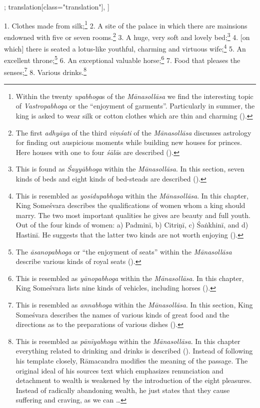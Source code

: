 \begin{alignment}[
  texts=edition[class="edition"];
  translation[class="translation"],
  ]
\begin{translation}
\begin{tlate}
  1. Clothes made from silk;\footnote{Within the twenty \textit{upabhoga}s of the \textit{Mānasollāsa} we find the interesting topic of \textit{Vastropabhoga} or the ``enjoyment of garments''. Particularly in summer, the king is asked to wear silk or cotton clothes which are thin and charming (\citeauthor[1939:14]{manasollasa}).} 2. A site of the palace in which there are mainsions endowned with five or seven rooms.\footnote{The first \textit{adhyāya} of the third \textit{viṃśati} of the \textit{Mānasollāsa} discusses astrology for finding out auspicious moments while building new houses for princes. Here houses with one to four \textit{śālā}s are described (\citeauthor[1939:6-7]{manasollasa}).} 3. A huge, very soft and lovely bed;\footnote{This is found as \textit{Śayyābhoga} within the \textit{Mānasollāsa}. In this section, seven kinds of beds and eight kinds of bed-steads are described (\citeauthor[1939:21]{manasollasa}).} 4. [on which] there is seated a lotus-like youthful, charming and virtuous wife;\footnote{This is resembled as \textit{yosidupabhoga} within the \textit{Mānasollāsa}. In this chapter, King Someśvara describes the qualifications of women whom a king should marry. The two most important qualities he gives are beauty and full youth. Out of the four kinds of women: a) Padminī, b) Citriṇī, c) Śaṅkhinī, and d) Hastinī. He suggests that the latter two kinds are not worth enjoying (\parencite[21]{manasollasa}).} 5. An excellent throne;\footnote{The \textit{āsanopabhoga} or ``the enjoyment of seats'' within the \textit{Mānasollāsa} describe various kinds of royal seats (\citeauthor[1939:15]{manasollasa}).} 6. An exceptional valuable horse;\footnote{This is resembled as \textit{yānopabhoga} within the \textit{Mānasollāsa}. In this chapter, King Someśvara lists nine kinds of vehicles, including horses (\citeauthor[1939:24]{manasollasa}).} 7. Food that pleases the senses;\footnote{This is resembled as \textit{annabhoga} within the \textit{Mānasollāsa}. In this section, King Someśvara describes the names of various kinds of great food and the directions as to the preparations of various dishes (\citeauthor[1939:21]{manasollasa}).} 8. Various drinks.\footnote{This is resembled as \textit{pānīyabhoga} within the \textit{Mānasollāsa}. In this chapter everything related to drinking and drinks is described (\citeauthor[1939:23]{manasollasa}). Instead of following his template closely, Rāmacandra modifies the meaning of the passage. The original ideal of his sources text which emphasizes renunciation and detachment to wealth is weakened by the introduction of the eight pleasures. Instead of radically abandoning wealth, he just states that they cause suffering and craving, as we can \ldots}\hfill \break 

\end{tlate}
\end{translation}
\end{alignment}

